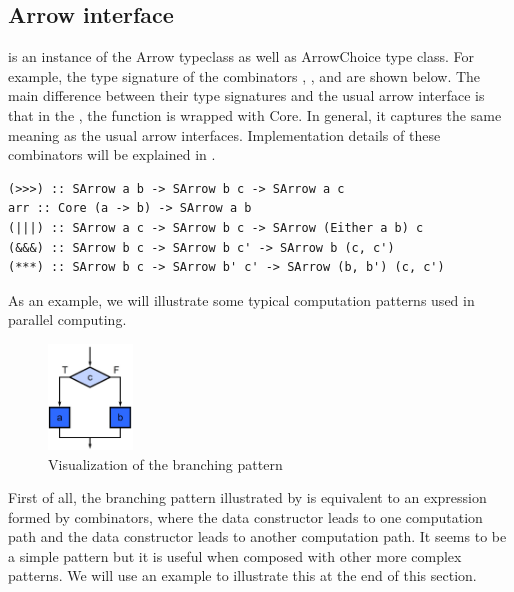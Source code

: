 \subsection{Arrow interface}
 is an instance of the Arrow typeclass as well as ArrowChoice type class. For example, the type signature of the combinators \hask{>>>}, \hask{|||}, \hask{&&&} and  are shown below. The main difference between their type signatures and the usual arrow interface is that in the , the function is wrapped with Core. In general, it captures the same meaning as the usual arrow interfaces. Implementation details of these combinators will be explained in .
\begin{code}
\begin{verbatim}
(>>>) :: SArrow a b -> SArrow b c -> SArrow a c
arr :: Core (a -> b) -> SArrow a b
(|||) :: SArrow a c -> SArrow b c -> SArrow (Either a b) c
(&&&) :: SArrow b c -> SArrow b c' -> SArrow b (c, c')
(***) :: SArrow b c -> SArrow b' c' -> SArrow (b, b') (c, c')
\end{verbatim}
\end{code}

As an example, we will illustrate some typical computation patterns used in parallel computing.
\begin{figure}[ht]
    \centering
    \includegraphics[width=0.2\textwidth]{arrow/select.png}
    \caption{Visualization of the branching pattern \cite{mccoolStructuredParallelPrograming2012}}
    \label{SArrow:fig:select}
\end{figure}

First of all, the branching pattern illustrated by  is equivalent to an expression formed by \hask{|||} combinators, where the data constructor  leads to one computation path and the data constructor  leads to another computation path. It seems to be a simple pattern but it is useful when composed with other more complex patterns. We will use an example to illustrate this at the end of this section.


